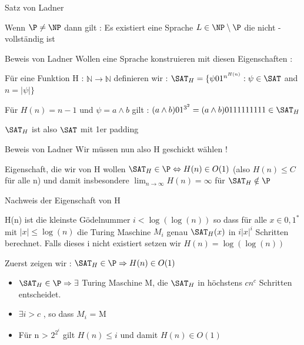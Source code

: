 \begin{frame}{Satz von Ladner}
	\begin{Satz}
	Wenn $\P \neq \NP$ dann gilt : \newline
	Es existiert eine Sprache $L \in \NP \setminus \P$ die nicht \NP -vollständig ist
	\end{Satz}
\end{frame}
\begin{frame}{Beweis von Ladner}
	Wollen eine Sprache konstruieren mit diesen Eigenschaften :
	\pause
	\begin{Definition}
		Für eine Funktion H : $\mathbb{N} \rightarrow \mathbb{N}$ definieren wir : \newline 	
		${\SAT}_H = \lbrace \psi 01^{n^{H(n)}} : \psi \in \SAT$ and $ n = |\psi| \rbrace$
	\end{Definition}

	\pause	
	
	\begin{Beispiel}
	Für $H(n) = n - 1$ und $\psi = a \land b$ gilt : \newline
	$(a \land b) 01^{3^2} = (a \land b) 0111111111 \in {\SAT}_H $
	\end{Beispiel}
	\pause
	${\SAT}_H$ ist also $\SAT$ mit 1er padding
\end{frame}

\begin{frame}{Beweis von Ladner}
	Wir müssen nun also H geschickt wählen !
	\pause
	\begin{block}{Eigenschaft, die wir von H wollen}
		${\SAT}_H \in \P \Leftrightarrow H(n) \in O(1)$ (also $H(n) \leq C$ f\"ur alle n) 				\newline
		und damit insbesondere $\lim_{n \to \infty}  H(n) = \infty$ für ${\SAT}_H \notin \P$
		
	\end{block}	
\end{frame}
\begin{frame}{Nachweis der Eigenschaft von H}
	\begin{Definition}
		H(n) ist die kleinste Gödelnummer $i < \log (\log (n))$ so dass für alle
		$ x \in {0,1}^*$ mit $|x| \leq \log(n) $ die Turing Maschine $M_i$ genau ${\SAT}_H(x)$ 		in $i|x|^i$ Schritten berechnet. Falls dieses i nicht existiert setzen wir $H(n) = 				\log(\log(n))$ 
	\end{Definition}
	\pause
	Zuerst zeigen wir : ${\SAT}_H \in \P \Rightarrow H(n) \in O(1)$
	\pause
	\begin{itemize}[<+->]
		\item ${\SAT}_H \in \P \Rightarrow \exists$ Turing Maschine M, die
			${\SAT}_H$ in höchstens $cn^c$ Schritten entscheidet.
		\item $\exists i > c$ , so dass $M_i$ = M
		\item Für n > $2^{2^i}$ gilt $H(n) \leq i$ und damit $H(n) \in O(1)$ 
	\end{itemize}
\end{frame}